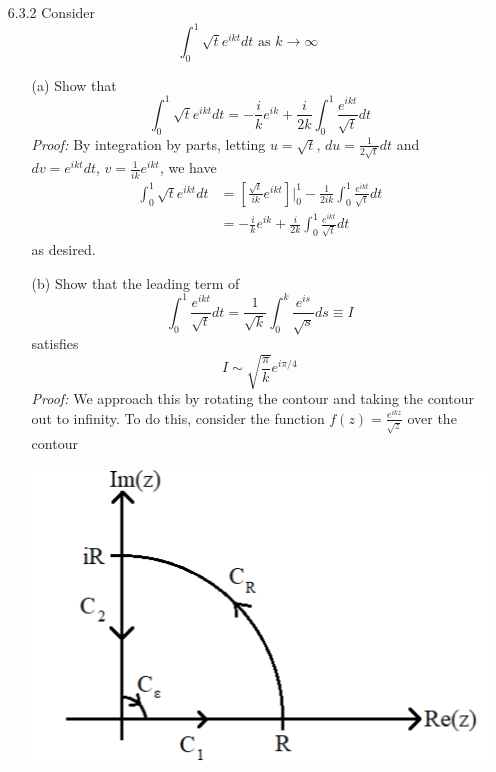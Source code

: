 \documentclass{article}
\begin{document}
\begin{itemize}
    
    \pagebreak


    \item[6.3.2] Consider
    \[\int_0^1\sqrt{t}e^{ikt}dt \text{ as } k \to \infty\]
    \begin{itemize}
        \item[(a)] Show that
        \[\int_0^1 \sqrt{t}e^{ikt}dt = -\frac{i}{k}e^{ik} + \frac{i}{2k}\int_0^1\frac{e^{ikt}}{\sqrt{t}}dt\]
        \textit{Proof:} By integration by parts, letting $u = \sqrt{t}$, $du = \frac{1}{2\sqrt{t}}dt$ and $dv = e^{ikt}dt$, $v = \frac{1}{ik}e^{ikt}$, we have
        \begin{align*}
            \int_0^1 \sqrt{t}e^{ikt}dt &= \left[\frac{\sqrt{t}}{ik}e^{ikt}\right]\bigg|_0^1 - \frac{1}{2ik}\int_0^1\frac{e^{ikt}}{\sqrt{t}}dt\\
            &= -\frac{i}{k}e^{ik} + \frac{i}{2k}\int_0^1\frac{e^{ikt}}{\sqrt{t}}dt
        \end{align*}
        as desired.
        \newline

        \item[(b)] Show that the leading term of 
        \[\int_0^1\frac{e^{ikt}}{\sqrt{t}}dt = \frac{1}{\sqrt{k}}\int_0^k\frac{e^{is}}{\sqrt{s}}ds \equiv I\]
        satisfies 
        \[I \sim \sqrt{\frac{\pi}{k}}e^{i\pi/4}\]
        \textit{Proof:} We approach this by rotating the contour and taking the contour out to infinity. To do this, consider the function $f(z) = \frac{e^{ikz}}{\sqrt{z}}$ over the contour

        \begin{center}
            \includegraphics[scale = 0.3]{semicircle_contour.PNG}
        \end{center}


\end{itemize}
\end{itemize}
\end{document}
